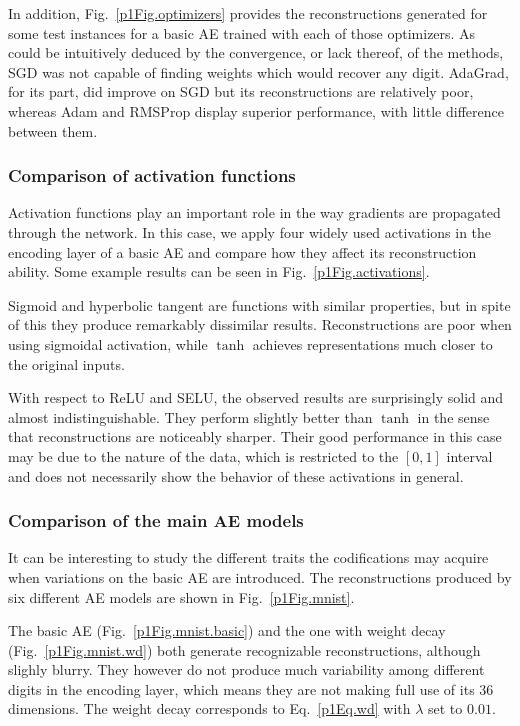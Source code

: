 In addition, Fig.~\ref{p1Fig.optimizers} provides the reconstructions generated for some test instances for a basic AE trained with each of those optimizers. As could be intuitively deduced by the convergence, or lack thereof, of the methods, SGD was not capable of finding weights which would recover any digit. AdaGrad, for its part, did improve on SGD but its reconstructions are relatively poor, whereas Adam and RMSProp display superior performance, with little difference between them.

\subsubsection{Comparison of activation functions}

Activation functions play an important role in the way gradients are propagated through the network. In this case, we apply four widely used activations in the encoding layer of a basic AE and compare how they affect its reconstruction ability. Some example results can be seen in Fig.~\ref{p1Fig.activations}.

Sigmoid and hyperbolic tangent are functions with similar properties, but in spite of this they produce remarkably dissimilar results. Reconstructions are poor when using sigmoidal activation, while $\tanh$ achieves representations much closer to the original inputs.

With respect to ReLU and SELU, the observed results are surprisingly solid and almost indistinguishable. They perform slightly better than $\tanh$ in the sense that reconstructions are noticeably sharper. Their good performance in this case may be due to the nature of the data, which is restricted to the $[0,1]$ interval and does not necessarily show the behavior of these activations in general.


\subsubsection{Comparison of the main AE models}\label{p1Sec.case.models}

It can be interesting to study the different traits the codifications may acquire when variations on the basic AE are introduced. The reconstructions produced by six different AE models are shown in Fig.~\ref{p1Fig.mnist}. 

The basic AE (Fig.~\ref{p1Fig.mnist.basic}) and the one with weight decay (Fig.~\ref{p1Fig.mnist.wd}) both generate recognizable reconstructions, although slighly blurry. They however do not produce much variability among different digits in the encoding layer, which means they are not making full use of its 36 dimensions. The weight decay corresponds to Eq.~\ref{p1Eq.wd} with $\lambda$ set to $0.01$.

